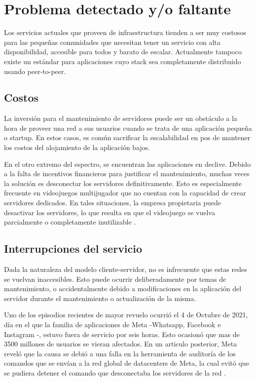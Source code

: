 \section{Problema detectado y/o faltante}
Los servicios actuales que proveen de infraestructura tienden a ser muy costosos para las pequeñas comunidades que necesitan tener un servicio con alta disponibilidad, accesible para todos y barato de escalar. Actualmente tampoco existe un estándar para aplicaciones cuyo stack sea completamente distribuido usando peer-to-peer.

\subsection{Costos}
La inversión para el mantenimiento de servidores puede ser un obstáculo a la hora de proveer una red a sus usuarios cuando se trata de una aplicación pequeña o startup. En estos casos, es común sacrificar la escalabilidad en pos de mantener los costos del alojamiento de la aplicación bajos.

En el otro extremo del espectro, se encuentran las aplicaciones en declive. Debido a la falta de incentivos financieros para justificar el mantenimiento, muchas veces la solución es desconectar los servidores definitivamente. Esto es especialmente frecuente en videojuegos multijugador que no cuentan con la capacidad de crear servidores dedicados. En tales situaciones, la empresa propietaria puede desactivar los servidores, lo que resulta en que el videojuego se vuelva parcialmente o completamente inutilizable \cite{dead-games}.

\subsection{Interrupciones del servicio}
Dada la naturaleza del modelo cliente-servidor, no es infrecuente que estas redes se vuelvan inaccesibles. Esto puede ocurrir deliberadamente por temas de mantenimiento, o accidentalmente debido a modificaciones en la aplicación del servidor durante el mantenimiento o actualización de la misma.

Uno de los episodios recientes de mayor revuelo ocurrió el 4 de Octubre de 2021, día en el que la familia de aplicaciones de Meta -Whatsapp, Facebook e Instagram -, estuvo fuera de servicio por seis horas. Esto ocasionó que mas de 3500 millones de usuarios se vieran afectados. En un articulo posterior, Meta reveló que la causa se debió a una falla en la herramienta de auditoría de los comandos que se envían a la red global de datacenters de Meta, la cual evitó que se pudiera detener el comando que desconectaba los servidores de la red \parencite{meta-offline}.

